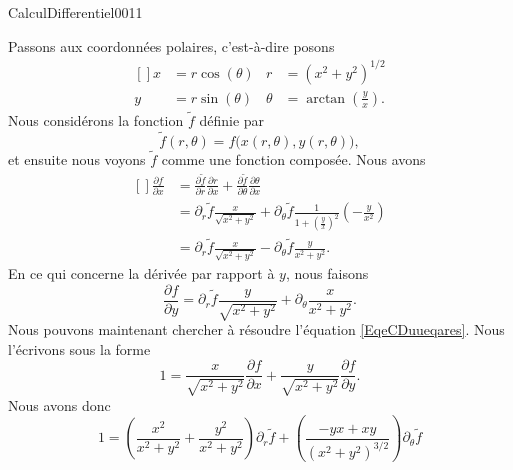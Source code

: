 \begin{corrige}{CalculDifferentiel0011}

	Passons aux coordonnées polaires, c'est-à-dire posons
	\begin{equation}
		\begin{aligned}[]
			x&=r\cos(\theta)	&r&=(x^2+y^2)^{1/2}\\
			y&=r\sin(\theta)	&\theta&=\arctan\left( \frac{ y }{ x } \right).
		\end{aligned}
	\end{equation}
	Nous considérons la fonction $\tilde f$ définie par
	\begin{equation}		\label{EqeCDchemuudevarfftrtxy}
		\tilde f(r,\theta)=f\big( x(r,\theta),y(r,\theta) \big),
	\end{equation}
	et ensuite nous voyons $\tilde f$ comme une fonction composée. Nous avons
	\begin{equation}
		\begin{aligned}[]
			\frac{ \partial f }{ \partial x }&=\frac{ \partial \tilde f }{ \partial r }\frac{ \partial r }{ \partial x }+\frac{ \partial \tilde f }{ \partial \theta }\frac{ \partial \theta }{ \partial x }\\
			&=\partial_r\tilde f\frac{ x }{ \sqrt{x^2+y^2} }+\partial_{\theta}\tilde f\frac{1}{ 1+\left( \frac{ y }{ x } \right)^2 }\left( -\frac{ y }{ x^2 } \right)\\
			&=\partial_r\tilde f\frac{ x }{ \sqrt{x^2+y^2} }-\partial_{\theta}\tilde f\frac{ y }{ x^2+y^2 }.
		\end{aligned}
	\end{equation}
	En ce qui concerne la dérivée par rapport à $y$, nous faisons
	\begin{equation}
		\frac{ \partial f }{ \partial y }=\partial_r\tilde f\frac{ y }{ \sqrt{x^2+y^2} }+\partial_{\theta}\frac{ x }{ x^2+y^2 }.
	\end{equation}
	Nous pouvons maintenant chercher à résoudre l'équation \eqref{EqeCDuueqares}. Nous l'écrivons sous la forme
	\begin{equation}
		1=\frac{ x }{ \sqrt{x^2+y^2} }\frac{ \partial f }{ \partial x }+\frac{ y }{ \sqrt{x^2+y^2} }\frac{ \partial f }{ \partial y }.
	\end{equation}
	Nous avons donc
	\begin{equation}
		1=\left( \frac{ x^2 }{ x^2+y^2 }+\frac{ y^2 }{ x^2+y^2 } \right)\partial_{r}\tilde f+\left( \frac{ -yx+xy }{ (x^2+y^2)^{3/2} } \right)\partial_{\theta}\tilde f
	\end{equation}

\end{corrige}
